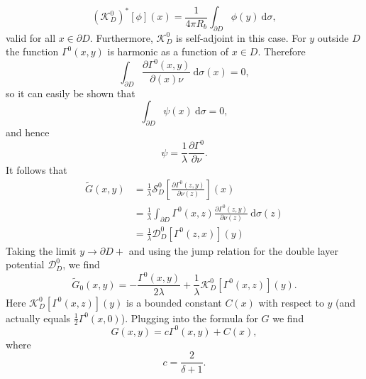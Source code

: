 \documentclass[a4paper]{article}
\theoremstyle{definition}
\newcommand{\dx}{\: \mathrm{d}}
\begin{document}
\begin{equation*}
\left(\mathcal{K}_D^0\right)^*[\phi](x) = \frac{1}{4\pi R_b}\int_{\partial D} \phi(y)\dx \sigma,
\end{equation*}
valid for all $x\in \partial D$. Furthermore, $\mathcal{K}_D^0$ is self-adjoint in this case. For $y$ outside $D$ the function $\Gamma^0(x,y)$ is harmonic as a function of $x\in D$. Therefore 
\begin{equation*}
\int_{\partial D} \frac{\partial \Gamma^0(x,y)}{\partial(x) \nu}\dx \sigma(x) = 0,
\end{equation*}
so it can easily be shown that 
\begin{equation*}
\int_{\partial D} \psi(x)\dx \sigma = 0,
\end{equation*}
and hence 
\begin{equation*}
\psi = \frac{1}{\lambda}\frac{\partial \Gamma^0}{\partial \nu}.
\end{equation*}
It follows that 
\begin{align*}
\tilde{G}(x,y) &= \frac{1}{\lambda}\mathcal{S}_D^0 \left[\frac{\partial \Gamma^0(z,y)}{\partial \nu(z)} \right](x) \\
&= \frac{1}{\lambda} \int_{\partial D} \Gamma^0(x,z) \frac{\partial \Gamma^0(z,y)}{\partial \nu(z)} \dx \sigma(z) \\
&=\frac{1}{\lambda}\mathcal{D}_D^0 \left[\Gamma^0(z,x)\right](y)
\end{align*}
Taking the limit $y\rightarrow \partial D+$ and using the jump relation for the double layer potential $\mathcal{D}_D^0$, we find
\begin{equation*}
\tilde{G}_0(x,y) = -\frac{\Gamma^0(x,y)}{2\lambda} + \frac{1}{\lambda}\mathcal{K}_D^0\left[\Gamma^0(x,z)\right](y).
\end{equation*}
Here $\mathcal{K}_D^0\left[\Gamma^0(x,z)\right](y)$ is a bounded constant $C(x)$ with respect to $y$ (and actually equals $\frac{1}{2}\Gamma^0(x,0)$). Plugging into the formula for $G$ we find
\begin{equation*}
G(x,y) = c\Gamma^0(x,y) + C(x),
\end{equation*}
where 
\begin{equation*}
c = \frac{2}{\delta+1}.
\end{equation*}
\end{document}
